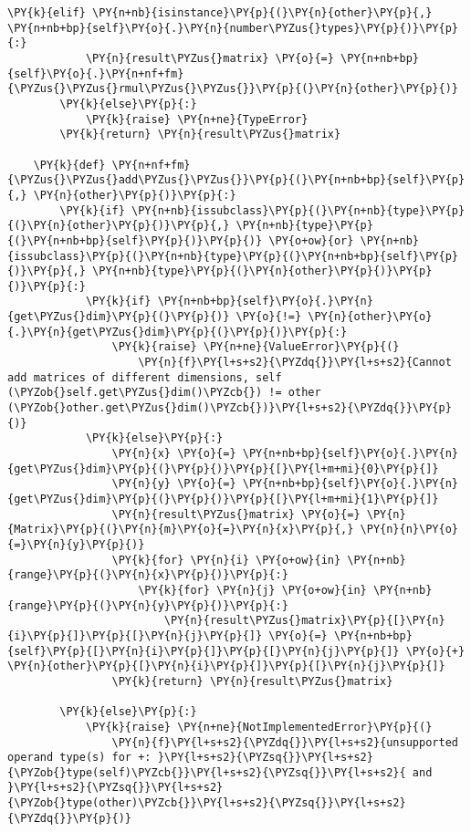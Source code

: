 \begin{Verbatim}[commandchars=\\\{\}]
        \PY{k}{elif} \PY{n+nb}{isinstance}\PY{p}{(}\PY{n}{other}\PY{p}{,} \PY{n+nb+bp}{self}\PY{o}{.}\PY{n}{number\PYZus{}types}\PY{p}{)}\PY{p}{:}
            \PY{n}{result\PYZus{}matrix} \PY{o}{=} \PY{n+nb+bp}{self}\PY{o}{.}\PY{n+nf+fm}{\PYZus{}\PYZus{}rmul\PYZus{}\PYZus{}}\PY{p}{(}\PY{n}{other}\PY{p}{)}
        \PY{k}{else}\PY{p}{:}
            \PY{k}{raise} \PY{n+ne}{TypeError}
        \PY{k}{return} \PY{n}{result\PYZus{}matrix}

    \PY{k}{def} \PY{n+nf+fm}{\PYZus{}\PYZus{}add\PYZus{}\PYZus{}}\PY{p}{(}\PY{n+nb+bp}{self}\PY{p}{,} \PY{n}{other}\PY{p}{)}\PY{p}{:}
        \PY{k}{if} \PY{n+nb}{issubclass}\PY{p}{(}\PY{n+nb}{type}\PY{p}{(}\PY{n}{other}\PY{p}{)}\PY{p}{,} \PY{n+nb}{type}\PY{p}{(}\PY{n+nb+bp}{self}\PY{p}{)}\PY{p}{)} \PY{o+ow}{or} \PY{n+nb}{issubclass}\PY{p}{(}\PY{n+nb}{type}\PY{p}{(}\PY{n+nb+bp}{self}\PY{p}{)}\PY{p}{,} \PY{n+nb}{type}\PY{p}{(}\PY{n}{other}\PY{p}{)}\PY{p}{)}\PY{p}{:}
            \PY{k}{if} \PY{n+nb+bp}{self}\PY{o}{.}\PY{n}{get\PYZus{}dim}\PY{p}{(}\PY{p}{)} \PY{o}{!=} \PY{n}{other}\PY{o}{.}\PY{n}{get\PYZus{}dim}\PY{p}{(}\PY{p}{)}\PY{p}{:}
                \PY{k}{raise} \PY{n+ne}{ValueError}\PY{p}{(}
                    \PY{n}{f}\PY{l+s+s2}{\PYZdq{}}\PY{l+s+s2}{Cannot add matrices of different dimensions, self (\PYZob{}self.get\PYZus{}dim()\PYZcb{}) != other (\PYZob{}other.get\PYZus{}dim()\PYZcb{})}\PY{l+s+s2}{\PYZdq{}}\PY{p}{)}
            \PY{k}{else}\PY{p}{:}
                \PY{n}{x} \PY{o}{=} \PY{n+nb+bp}{self}\PY{o}{.}\PY{n}{get\PYZus{}dim}\PY{p}{(}\PY{p}{)}\PY{p}{[}\PY{l+m+mi}{0}\PY{p}{]}
                \PY{n}{y} \PY{o}{=} \PY{n+nb+bp}{self}\PY{o}{.}\PY{n}{get\PYZus{}dim}\PY{p}{(}\PY{p}{)}\PY{p}{[}\PY{l+m+mi}{1}\PY{p}{]}
                \PY{n}{result\PYZus{}matrix} \PY{o}{=} \PY{n}{Matrix}\PY{p}{(}\PY{n}{m}\PY{o}{=}\PY{n}{x}\PY{p}{,} \PY{n}{n}\PY{o}{=}\PY{n}{y}\PY{p}{)}
                \PY{k}{for} \PY{n}{i} \PY{o+ow}{in} \PY{n+nb}{range}\PY{p}{(}\PY{n}{x}\PY{p}{)}\PY{p}{:}
                    \PY{k}{for} \PY{n}{j} \PY{o+ow}{in} \PY{n+nb}{range}\PY{p}{(}\PY{n}{y}\PY{p}{)}\PY{p}{:}
                        \PY{n}{result\PYZus{}matrix}\PY{p}{[}\PY{n}{i}\PY{p}{]}\PY{p}{[}\PY{n}{j}\PY{p}{]} \PY{o}{=} \PY{n+nb+bp}{self}\PY{p}{[}\PY{n}{i}\PY{p}{]}\PY{p}{[}\PY{n}{j}\PY{p}{]} \PY{o}{+} \PY{n}{other}\PY{p}{[}\PY{n}{i}\PY{p}{]}\PY{p}{[}\PY{n}{j}\PY{p}{]}
                \PY{k}{return} \PY{n}{result\PYZus{}matrix}

        \PY{k}{else}\PY{p}{:}
            \PY{k}{raise} \PY{n+ne}{NotImplementedError}\PY{p}{(}
                \PY{n}{f}\PY{l+s+s2}{\PYZdq{}}\PY{l+s+s2}{unsupported operand type(s) for +: }\PY{l+s+s2}{\PYZsq{}}\PY{l+s+s2}{\PYZob{}type(self)\PYZcb{}}\PY{l+s+s2}{\PYZsq{}}\PY{l+s+s2}{ and }\PY{l+s+s2}{\PYZsq{}}\PY{l+s+s2}{\PYZob{}type(other)\PYZcb{}}\PY{l+s+s2}{\PYZsq{}}\PY{l+s+s2}{\PYZdq{}}\PY{p}{)}


\end{Verbatim}
